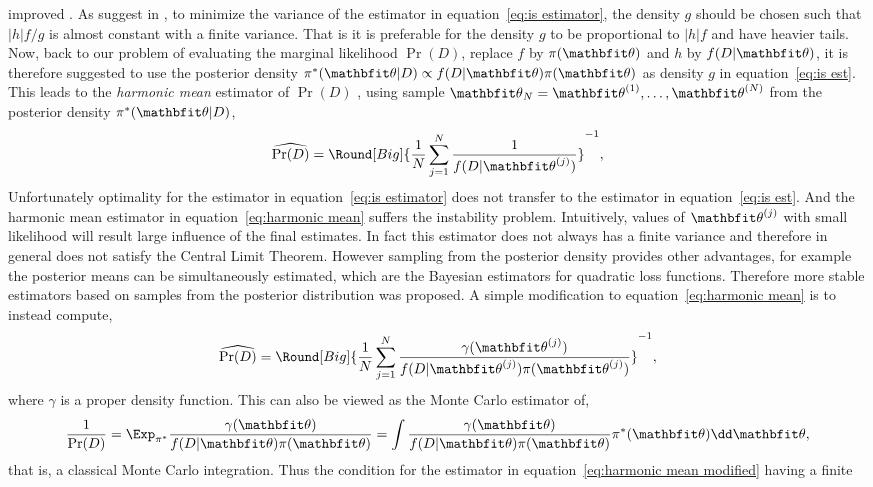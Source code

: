 improved \parencite{Casella1998}. As suggest in
\textcite[][sec.~3.3]{Robert2004}, to minimize the variance of the estimator
in equation~\eqref{eq:is estimator}, the density $g$ should be chosen such
that $|h|f/g$ is almost constant with a finite variance. That is it is
preferable for the density $g$ to be proportional to $|h|f$ and have heavier
tails. Now, back to our problem of evaluating the marginal likelihood
$\Pr(D)$, replace $f$ by $\pi(\bth)$ and $h$ by $f(D|\bth)$, it is therefore
suggested to use the posterior density $\pi^*(\bth|D) \propto
f(D|\bth)\pi(\bth)$ as density $g$ in equation~\eqref{eq:is est}. This leads
to the \emph{harmonic mean} estimator of $\Pr(D)$ \parencite{Newton1994},
using sample $\bth_N= \mcvec{\bth}{N}$ from the posterior density
$\pi^*(\bth|D)$,
\begin{equation}
  \widehat{\Pr(D)} =
  \Round[Big]{\frac{1}{N}\sum_{j=1}^N\frac{1}{f(D|\bth^{(j)})}}^{-1},
  \label{eq:harmonic mean}
\end{equation}
Unfortunately optimality for the estimator in equation~\eqref{eq:is estimator}
does not transfer to the estimator in equation~\eqref{eq:is est}. And the
harmonic mean estimator in equation~\eqref{eq:harmonic mean} suffers the
instability problem. Intuitively, values of $\bth^{(j)}$ with small likelihood
will result large influence of the final estimates. In fact this estimator
does not always has a finite variance and therefore in general does not
satisfy the Central Limit Theorem. However sampling from the posterior density
provides other advantages, for example the posterior means can be
simultaneously estimated, which are the Bayesian estimators for quadratic loss
functions. Therefore more stable estimators based on samples from the
posterior distribution was proposed. A simple modification to
equation~\eqref{eq:harmonic mean} is to instead compute,
\begin{equation}
  \widehat{\Pr(D)} = \Round[Big]{
    \frac{1}{N}\sum_{j=1}^N\frac{\gamma(\bth^{(j)})}
    {f(D|\bth^{(j)})\pi(\bth^{(j)})}}^{-1},
  \label{eq:harmonic mean modified}
\end{equation}
where $\gamma$ is a proper density function. This can also be viewed as the
Monte Carlo estimator of,
\begin{equation}
  \frac{1}{\Pr(D)}
  = \Exp_{\pi^*}\frac{\gamma(\bth)}{f(D|\bth)\pi(\bth)}
  = \int\frac{\gamma(\bth)}{f(D|\bth)\pi(\bth)}\pi^*(\bth)\dd\bth,
\end{equation}
that is, a classical Monte Carlo integration. Thus the condition for the
estimator in equation~\eqref{eq:harmonic mean modified} having a finite
